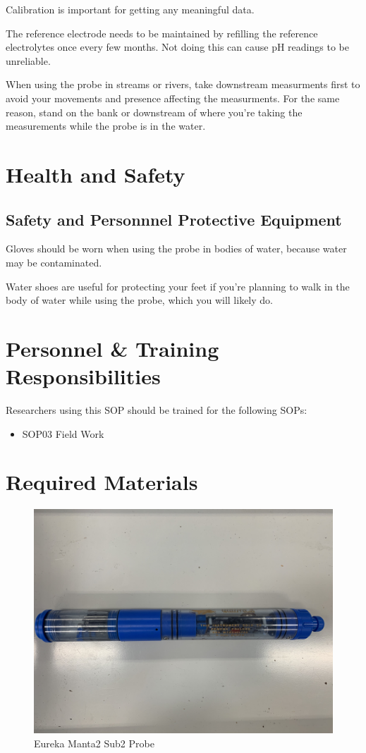 \documentclass[12pt]{../SOP3}\usepackage[]{graphicx}\usepackage[]{color}
\begin{document}
\NP Calibration is important for getting any meaningful data. 


\NP The reference electrode needs to be maintained by refilling the reference electrolytes once every few months. Not doing this can cause pH readings to be unreliable. 

\NP When using the probe in streams or rivers, take downstream measurments first to avoid your movements and presence affecting the measurments. For the same reason, stand on the bank or downstream of where you're taking the measurements while the probe is in the water.  

\section{Health and Safety}

\subsection{Safety and Personnnel Protective Equipment}

\NP Gloves should be worn when using the probe in bodies of water, because water may be contaminated. 

\NP Water shoes are useful for protecting your feet if you're planning to walk in the body of water while using the probe, which you will likely do. 

\section{Personnel \& Training Responsibilities}

Researchers using this SOP should be trained for the following SOPs:

\begin{itemize}
  \item SOP03 Field Work
\end{itemize}

\section{Required Materials}



\begin{figure}
\centering
\includegraphics[width=.5\textwidth]{Images/Manta.jpg}
\caption{Eureka Manta2 Sub2 Probe}
\label{Manta.JPG}
\end{figure}
\end{document}
